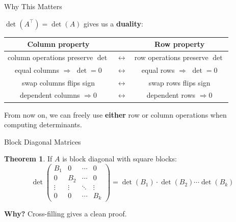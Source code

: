 \documentclass[10pt]{beamer}
\theoremstyle{definition}
\newtheorem{thm}{Theorem}[section]
\newcommand{\x}[1]{\alert{\textbf{#1}}}
\begin{document}
\begin{frame}{Why This Matters}

$\det(A^\top) = \det(A)$ gives us a \x{duality}:

\vfill

\begin{center}
\renewcommand{\arraystretch}{1.4}
\begin{tabular}{ccc}
\textbf{Column property} & & \textbf{Row property} \\
\hline
column operations preserve $\det$ & $\leftrightarrow$ & row operations preserve $\det$ \\
equal columns $\Rightarrow$ $\det=0$ & $\leftrightarrow$ & equal rows $\Rightarrow$ $\det=0$ \\
swap columns flips sign & $\leftrightarrow$ & swap rows flips sign \\
dependent columns $\Rightarrow 0$ & $\leftrightarrow$ & dependent rows $\Rightarrow 0$
\end{tabular}
\end{center}

\vfill

From now on, we can freely use \x{either} row or column operations when computing determinants.

\end{frame}


\begin{frame}{Block Diagonal Matrices}

\begin{thm}
If $A$ is block diagonal with square blocks:
$$
\det\begin{pmatrix} B_1 & 0 & \cdots & 0 \\ 0 & B_2 & \cdots & 0 \\ \vdots & \vdots & \ddots & \vdots \\ 0 & 0 & \cdots & B_k \end{pmatrix}
= \det(B_1)\cdot\det(B_2)\cdots\det(B_k)
$$
\end{thm}

\vfill

\textbf{Why?} Cross-filling gives a clean proof.

\end{frame}
\end{document}

